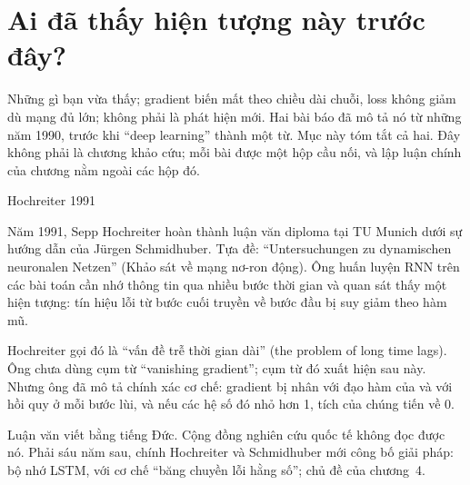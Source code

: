 %

\section{Ai đã thấy hiện tượng này trước đây?}
\label{sec:ch02-cau-noi}

Những gì bạn vừa thấy; gradient biến mất theo chiều dài chuỗi, loss không
giảm dù mạng đủ lớn; không phải là phát hiện mới. Hai bài báo đã mô tả nó
từ những năm 1990, trước khi ``deep learning'' thành một từ. Mục này tóm tắt
cả hai. Đây không phải là chương khảo cứu; mỗi bài được một hộp cầu nối, và
lập luận chính của chương nằm ngoài các hộp đó.

\begin{bridge}{Hochreiter 1991}
%
%

Năm 1991, Sepp Hochreiter hoàn thành luận văn diploma tại TU Munich dưới sự
hướng dẫn của Jürgen Schmidhuber. Tựa đề: \enquote{Untersuchungen zu
dynamischen neuronalen Netzen} (Khảo sát về mạng nơ-ron động). Ông huấn luyện
RNN trên các bài toán cần nhớ thông tin qua nhiều bước thời gian và quan sát
thấy một hiện tượng: tín hiệu lỗi từ bước cuối truyền về bước đầu bị suy
giảm theo hàm mũ.

Hochreiter gọi đó là \enquote{vấn đề trễ thời gian dài} (the problem of long
time lags). Ông chưa dùng cụm từ \enquote{vanishing gradient}; cụm từ đó
xuất hiện sau này. Nhưng ông đã mô tả chính xác cơ chế: gradient bị nhân với
đạo hàm của  và với
 hồi quy ở mỗi bước lùi,
và nếu các hệ số đó nhỏ hơn 1, tích của chúng tiến về 0.

Luận văn viết bằng tiếng Đức. Cộng đồng nghiên cứu quốc tế không đọc được nó.
Phải sáu năm sau, chính Hochreiter và Schmidhuber mới công bố giải pháp: bộ
nhớ LSTM, với cơ chế \enquote{băng chuyền lỗi hằng số}; chủ đề của chương~4.

%
%
\end{bridge}

